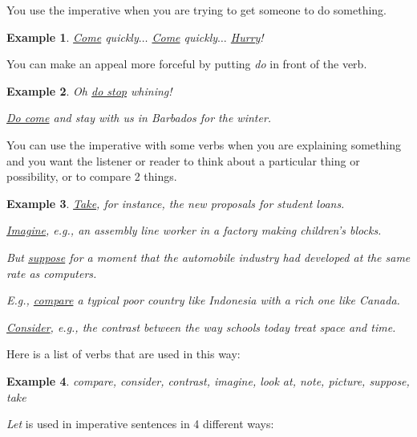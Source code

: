 \documentclass[oneside]{book}
\numberwithin{equation}{section}
\newtheorem{example}{Example}[section]
\begin{document}
%
\noindent{} You use the imperative when you are trying to get someone to do something.
\begin{example}
    \underline{Come} quickly$\ldots$ \underline{Come} quickly$\ldots$ \underline{Hurry}!
\end{example}
You can make an appeal more forceful by putting \textit{do} in front of the verb.
\begin{example}
    Oh \underline{do stop} whining!
    
    \underline{Do come} and stay with us in Barbados for the winter.
\end{example}
%
\noindent{} You can use the imperative with some verbs when you are explaining something and you want the listener or reader to think about a particular thing or possibility, or to compare 2 things.
\begin{example}
    \underline{Take}, for instance, the new proposals for student loans.
    
    \underline{Imagine}, e.g., an assembly line worker in a factory making children's blocks.
    
    But \underline{suppose} for a moment that the automobile industry had developed at the same rate as computers.
    
    E.g., \underline{compare} a typical poor country like Indonesia with a rich one like Canada.
    
    \underline{Consider}, e.g., the contrast between the way schools today treat space and time.
\end{example}
Here is a list of verbs that are used in this way:
\begin{example}
    compare, consider, contrast, imagine, look at, note, picture, suppose, take
\end{example}
%
\noindent{} \textit{Let} is used in imperative sentences in 4 different ways:
\end{document}
